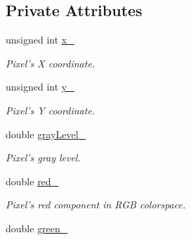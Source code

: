 \subsection*{Private Attributes}
\begin{CompactItemize}
\item 
\hypertarget{class_pixel_9f8a45ad3cbcab59543e4f7d4842ae6d}{
unsigned int \hyperlink{class_pixel_9f8a45ad3cbcab59543e4f7d4842ae6d}{x\_\-}}
\label{class_pixel_9f8a45ad3cbcab59543e4f7d4842ae6d}

\begin{CompactList}\small\item\em Pixel's X coordinate. \item\end{CompactList}\item 
\hypertarget{class_pixel_da45113dcf9ef4a0c3d5052db42da355}{
unsigned int \hyperlink{class_pixel_da45113dcf9ef4a0c3d5052db42da355}{y\_\-}}
\label{class_pixel_da45113dcf9ef4a0c3d5052db42da355}

\begin{CompactList}\small\item\em Pixel's Y coordinate. \item\end{CompactList}\item 
\hypertarget{class_pixel_545bed829ed92f39962a30ace0d7e88d}{
double \hyperlink{class_pixel_545bed829ed92f39962a30ace0d7e88d}{grayLevel\_\-}}
\label{class_pixel_545bed829ed92f39962a30ace0d7e88d}

\begin{CompactList}\small\item\em Pixel's gray level. \item\end{CompactList}\item 
\hypertarget{class_pixel_7b7fcc89637b192817dc98bc888a8d7d}{
double \hyperlink{class_pixel_7b7fcc89637b192817dc98bc888a8d7d}{red\_\-}}
\label{class_pixel_7b7fcc89637b192817dc98bc888a8d7d}

\begin{CompactList}\small\item\em Pixel's red component in RGB colorspace. \item\end{CompactList}\item 
\hypertarget{class_pixel_eb119b3fac6cf28c190dffe0bbca4d1b}{
double \hyperlink{class_pixel_eb119b3fac6cf28c190dffe0bbca4d1b}{green\_\-}}
\label{class_pixel_eb119b3fac6cf28c190dffe0bbca4d1b}


\end{CompactItemize}
